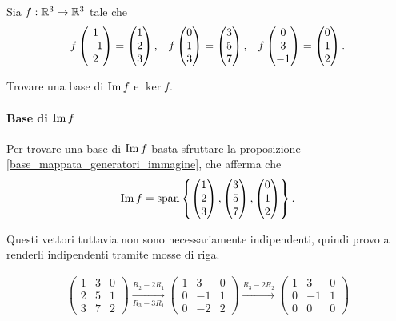 \begin{example}
    Sia $f : \mathbb{R}^3 \to \mathbb{R}^3$ tale che \begin{align*}
        f\begin{pmatrix} 1\\-1\\2 \end{pmatrix} = \begin{pmatrix} 1\\2\\3 \end{pmatrix}, &&f\begin{pmatrix} 0\\1\\3 \end{pmatrix} = \begin{pmatrix} 3\\5\\7 \end{pmatrix}, &&f\begin{pmatrix} 0\\3\\-1 \end{pmatrix} = \begin{pmatrix} 0\\1\\2 \end{pmatrix}.
    \end{align*}

    Trovare una base di $\operatorname{Im}f$ e $\ker f$.

    \paragraph{Base di $\operatorname{Im}f$} Per trovare una base di $\operatorname{Im}f$ basta sfruttare la proposizione \ref{base_mappata_generatori_immagine}, che afferma che \[
        \operatorname{Im}f = \operatorname{span}\left\{\begin{pmatrix} 1\\2\\3 \end{pmatrix}, \begin{pmatrix} 3\\5\\7 \end{pmatrix}, \begin{pmatrix} 0\\1\\2 \end{pmatrix}\right\}. 
    \]

    Questi vettori tuttavia non sono necessariamente indipendenti, quindi provo a renderli indipendenti tramite mosse di riga.

    \begin{gather*}
        \begin{pmatrix}
            1 & 3 & 0 \\
            2 & 5 & 1 \\
            3 & 7 & 2 
        \end{pmatrix} \xrightarrow[R_3 - 3R_1]{R_2 - 2R_1}
        \begin{pmatrix}
            1 & 3 & 0 \\
            0 & -1 & 1 \\
            0 & -2 & 2 
        \end{pmatrix} \xrightarrow[]{R_3 - 2R_2}
        \begin{pmatrix}
            1 & 3 & 0 \\
            0 & -1 & 1 \\
            0 & 0 & 0 
        \end{pmatrix}
    \end{gather*}


\end{example}
